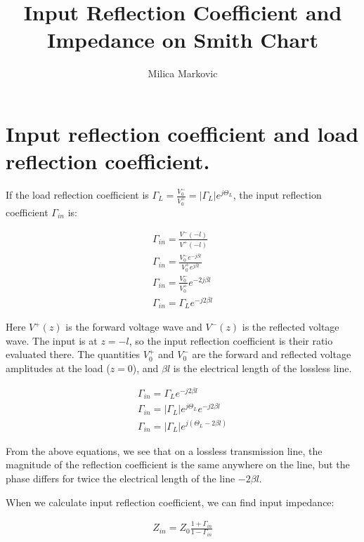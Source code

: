 \documentclass{ximera}
\title{Input Reflection Coefficient and Impedance on Smith Chart}
\author{Milica Markovic}
\begin{document}
  
\begin{abstract}  

\end{abstract}  
\maketitle    






\section{Input reflection coefficient and load reflection coefficient.}


If the load reflection coefficient is $\Gamma_L=\frac{V_0^-}{V_0^+}=|\Gamma_L| e^{j \Theta_{L}}$, 
the input reflection coefficient $\Gamma_{in}$ is: 

\begin{eqnarray}
\Gamma_{in}=\frac{V^-(-l)}{V^+(-l)} \\
\Gamma_{in}= \frac{V_0^- e^{-j\beta l}}{V_0^+ e^{j\beta l}} \\
\Gamma_{in}= \frac{V_0^-}{V_0^+} e^{-2j \beta l} \\
\Gamma_{in}= \Gamma_L e^{-j2 \beta l}
\end{eqnarray}

Here $V^+(z)$ is the forward voltage wave and $V^-(z)$ is the reflected voltage wave. The input is at $z=-l$, so the input reflection coefficient is their ratio evaluated there. The quantities $V_0^+$ and $V_0^-$ are the forward and reflected voltage amplitudes at the load ($z=0$), and $\beta l$ is the electrical length of the lossless line.

\begin{eqnarray}
\Gamma_{in}=\Gamma_L e^{-j2 \beta l} \\
\Gamma_{in} = |\Gamma_L| e^{j \Theta_{L}} e^{-j2 \beta l} \\
\Gamma_{in} = |\Gamma_L| e^{j(\Theta_{L} -2 \beta l) } 
\end{eqnarray}

From the above equations, we see that on a lossless transmission line, the magnitude of the reflection coefficient is the same anywhere on the line, but the phase differs for twice the electrical length of the line $-2 \beta l$.

When we calculate input reflection coefficient, we can find input impedance:

\begin{eqnarray}
Z_{in}=Z_0 \frac{1+\Gamma_{in}}{1-\Gamma_{in}}
\end{eqnarray}
\end{document}
